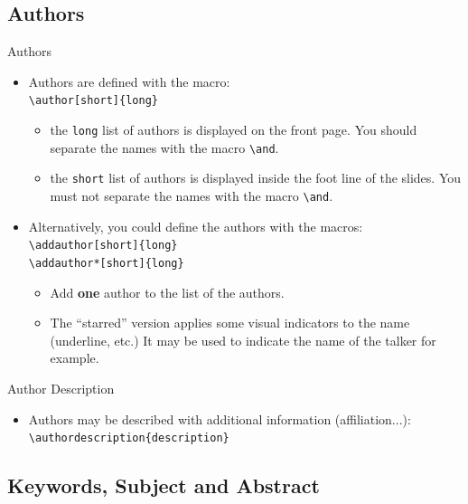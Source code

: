 \documentclass[english,sectioncirclenumberstyle]{le2iutbmbeamer}
\begin{document}
\subsection{Authors}

\begin{frame}{Authors}
	\begin{itemize}
	\item Authors are defined with the macro: \\
		\texttt{{\textbackslash}author[short]\{long\}}
		\begin{itemize}
		\item the \texttt{long} list of authors is displayed on the front page. You should separate the names with the macro \texttt{{\textbackslash}and}.
		\item the \texttt{short} list of authors is displayed inside the foot line of the slides. You \alert{must not separate} the names with the macro \texttt{{\textbackslash}and}.
		\end{itemize}
	\vfill
	\item \alert{Alternatively}, you could define the authors with the macros: \\
		\texttt{{\textbackslash}addauthor[short]\{long\}} \\
		\texttt{{\textbackslash}addauthor*[short]\{long\}}
		\begin{itemize}
		\item Add \textbf{one} author to the list of the authors.
		\item The ``starred'' version applies some visual indicators to the name (underline, etc.) It may be used to indicate the name of the talker for example.
		\end{itemize}
	\end{itemize}
	\vfill
\end{frame}

\begin{frame}{Author Description}
	\begin{itemize}
	\item Authors may be described with additional information (affiliation...): \\
		\texttt{{\textbackslash}authordescription\{description\}}
	\end{itemize}
	\vfill
\end{frame}

\subsection{Keywords, Subject and Abstract}
\end{document}
